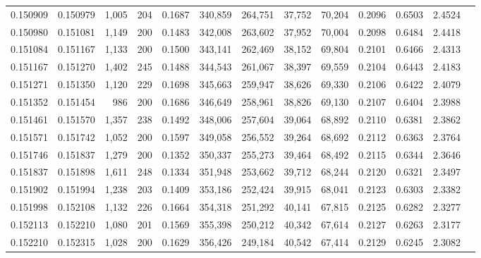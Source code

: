 \begin{tabular}{rrrrrrrrrrrrr}
0.150909 & 0.150979 & 1,005 & 204 &                                     0.1687 & 340,859 & 264,751 &  37,752 &  70,204 & 0.2096 & 0.6503 & 2.4524 \\
0.150980 & 0.151081 & 1,149 & 200 &                                     0.1483 & 342,008 & 263,602 &  37,952 &  70,004 & 0.2098 & 0.6484 & 2.4418 \\
0.151084 & 0.151167 & 1,133 & 200 &                                     0.1500 & 343,141 & 262,469 &  38,152 &  69,804 & 0.2101 & 0.6466 & 2.4313 \\
0.151167 & 0.151270 & 1,402 & 245 &                                     0.1488 & 344,543 & 261,067 &  38,397 &  69,559 & 0.2104 & 0.6443 & 2.4183 \\
0.151271 & 0.151350 & 1,120 & 229 &                                     0.1698 & 345,663 & 259,947 &  38,626 &  69,330 & 0.2106 & 0.6422 & 2.4079 \\
0.151352 & 0.151454 &   986 & 200 &                                     0.1686 & 346,649 & 258,961 &  38,826 &  69,130 & 0.2107 & 0.6404 & 2.3988 \\
0.151461 & 0.151570 & 1,357 & 238 &                                     0.1492 & 348,006 & 257,604 &  39,064 &  68,892 & 0.2110 & 0.6381 & 2.3862 \\
0.151571 & 0.151742 & 1,052 & 200 &                                     0.1597 & 349,058 & 256,552 &  39,264 &  68,692 & 0.2112 & 0.6363 & 2.3764 \\
0.151746 & 0.151837 & 1,279 & 200 &                                     0.1352 & 350,337 & 255,273 &  39,464 &  68,492 & 0.2115 & 0.6344 & 2.3646 \\
0.151837 & 0.151898 & 1,611 & 248 &                                     0.1334 & 351,948 & 253,662 &  39,712 &  68,244 & 0.2120 & 0.6321 & 2.3497 \\
0.151902 & 0.151994 & 1,238 & 203 &                                     0.1409 & 353,186 & 252,424 &  39,915 &  68,041 & 0.2123 & 0.6303 & 2.3382 \\
0.151998 & 0.152108 & 1,132 & 226 &                                     0.1664 & 354,318 & 251,292 &  40,141 &  67,815 & 0.2125 & 0.6282 & 2.3277 \\
0.152113 & 0.152210 & 1,080 & 201 &                                     0.1569 & 355,398 & 250,212 &  40,342 &  67,614 & 0.2127 & 0.6263 & 2.3177 \\
0.152210 & 0.152315 & 1,028 & 200 &                                     0.1629 & 356,426 & 249,184 &  40,542 &  67,414 & 0.2129 & 0.6245 & 2.3082 \\

\end{tabular}
